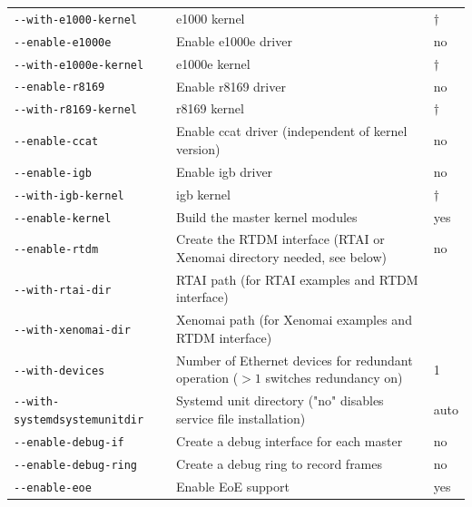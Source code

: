 \documentclass[a4paper,12pt,BCOR=6mm,bibtotoc,idxtotoc]{scrbook}
\begin{document}
\begin{longtable}{l|p{}|l}
\lstinline+--with-e1000-kernel+ & e1000 kernel & $\dagger$\\

\lstinline+--enable-e1000e+ & Enable e1000e driver & no\\

\lstinline+--with-e1000e-kernel+ & e1000e kernel & $\dagger$\\

\lstinline+--enable-r8169+ & Enable r8169 driver & no\\

\lstinline+--with-r8169-kernel+ & r8169 kernel & $\dagger$\\

\lstinline+--enable-ccat+ & Enable ccat driver (independent of kernel version)
& no\\

\lstinline+--enable-igb+ & Enable igb driver & no\\

\lstinline+--with-igb-kernel+ & igb kernel & $\dagger$\\

\hline

\lstinline+--enable-kernel+ & Build the master kernel modules & yes\\

\lstinline+--enable-rtdm+ & Create the RTDM interface (RTAI or Xenomai
directory needed, see below) & no\\

\lstinline+--with-rtai-dir+ & RTAI path (for RTAI examples and RTDM interface)
& \\

\lstinline+--with-xenomai-dir+ & Xenomai path (for Xenomai examples and RTDM
interface) & \\

\lstinline+--with-devices+ & Number of Ethernet devices for redundant
operation ($>1$ switches redundancy on) & 1\\

\lstinline+--with-systemdsystemunitdir+ & Systemd unit directory ("no"
disables service file installation)
& auto \\

\lstinline+--enable-debug-if+ & Create a debug interface for each master & no\\

\lstinline+--enable-debug-ring+ & Create a debug ring to record frames & no\\

\lstinline+--enable-eoe+ & Enable EoE support & yes\\


\end{longtable}
\end{document}

